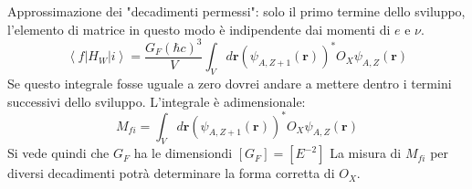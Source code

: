 Approssimazione dei "decadimenti permessi": solo il primo termine dello sviluppo, l'elemento di matrice in questo modo è indipendente dai momenti di $e$ e $\nu$.
\begin{equation*}
    \left\langle f\left|H_W\right| i\right\rangle=\frac{G_F(\hbar c)^3}{V} \int_V d \mathbf{r}\left(\psi_{A, Z+1}(\mathbf{r}) \right)^* O_X \psi_{A, Z}(\mathbf{r})
\end{equation*}
Se questo integrale fosse uguale a zero dovrei andare a mettere dentro i termini successivi dello sviluppo.
L'integrale è adimensionale:
\begin{equation*}
    M_{fi}=\int_V d \mathbf{r}\left(\psi_{A, Z+1}(\mathbf{r}) \right)^* O_X \psi_{A, Z}(\mathbf{r})
\end{equation*}
Si vede quindi che $G_F$ ha le dimensiondi $[G_F]=[E^{-2}]$
La misura di $M_{fi}$ per diversi decadimenti potrà determinare la forma corretta di $O_X$.
